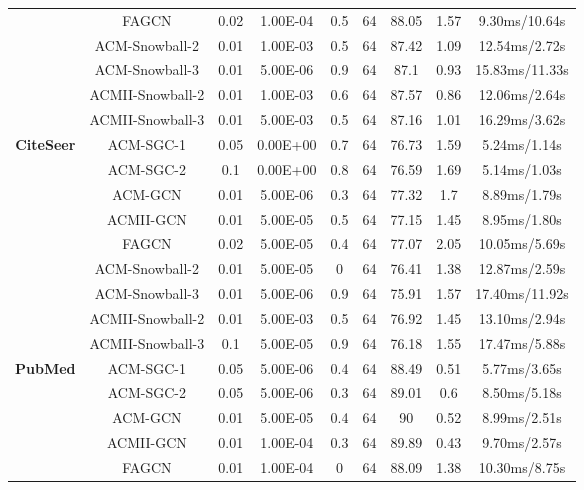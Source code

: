 \documentclass{article}
\newcommand{\0}{{\boldsymbol{0}}}
\newcommand{\6}{{\partial}}
\newcommand{\8}{{\infty}}
\newcommand{\4}{{\nabla}}
\begin{document}
\begin{table}[htbp]
{\begin{tabular}{c|c|ccccccc}
          & FAGCN & 0.02  & 1.00E-04 & 0.5   & 64    & 88.05 & 1.57  & 9.30ms/10.64s \\
          & ACM-Snowball-2 & 0.01  & 1.00E-03 & 0.5   & 64    & 87.42 & 1.09  & 12.54ms/2.72s \\
          & ACM-Snowball-3 & 0.01  & 5.00E-06 & 0.9   & 64    & 87.1  & 0.93  & 15.83ms/11.33s \\
          & ACMII-Snowball-2 & 0.01  & 1.00E-03 & 0.6   & 64    & 87.57 & 0.86  & 12.06ms/2.64s \\
          & ACMII-Snowball-3 & 0.01  & 5.00E-03 & 0.5   & 64    & 87.16 & 1.01  & 16.29ms/3.62s \\
           \midrule
    \multirow{9}[0]{*}{\textbf{CiteSeer}} & ACM-SGC-1 & 0.05  & 0.00E+00 & 0.7   & 64    & 76.73 & 1.59  & 5.24ms/1.14s \\
          & ACM-SGC-2 & 0.1   & 0.00E+00 & 0.8   & 64    & 76.59 & 1.69  & 5.14ms/1.03s \\
          & ACM-GCN & 0.01  & 5.00E-06 & 0.3   & 64    & 77.32 & 1.7   & 8.89ms/1.79s \\
          & ACMII-GCN & 0.01  & 5.00E-05 & 0.5   & 64    & 77.15 & 1.45  & 8.95ms/1.80s \\
          & FAGCN & 0.02  & 5.00E-05 & 0.4   & 64    & 77.07 & 2.05  & 10.05ms/5.69s \\
          & ACM-Snowball-2 & 0.01  & 5.00E-05 & 0     & 64    & 76.41 & 1.38  & 12.87ms/2.59s \\
          & ACM-Snowball-3 & 0.01  & 5.00E-06 & 0.9   & 64    & 75.91 & 1.57  & 17.40ms/11.92s \\
          & ACMII-Snowball-2 & 0.01  & 5.00E-03 & 0.5   & 64    & 76.92 & 1.45  & 13.10ms/2.94s \\
          & ACMII-Snowball-3 & 0.1   & 5.00E-05 & 0.9   & 64    & 76.18 & 1.55  & 17.47ms/5.88s \\
           \midrule
    \multirow{9}[1]{*}{\textbf{PubMed}} & ACM-SGC-1 & 0.05  & 5.00E-06 & 0.4   & 64    & 88.49 & 0.51  & 5.77ms/3.65s \\
          & ACM-SGC-2 & 0.05  & 5.00E-06 & 0.3   & 64    & 89.01 & 0.6   & 8.50ms/5.18s \\
          & ACM-GCN & 0.01  & 5.00E-05 & 0.4   & 64    & 90    & 0.52  & 8.99ms/2.51s \\
          & ACMII-GCN & 0.01  & 1.00E-04 & 0.3   & 64    & 89.89 & 0.43  & 9.70ms/2.57s \\
          & FAGCN & 0.01  & 1.00E-04 & 0     & 64    & 88.09 & 1.38  & 10.30ms/8.75s \\

\end{tabular}}
\end{table}
\end{document}

